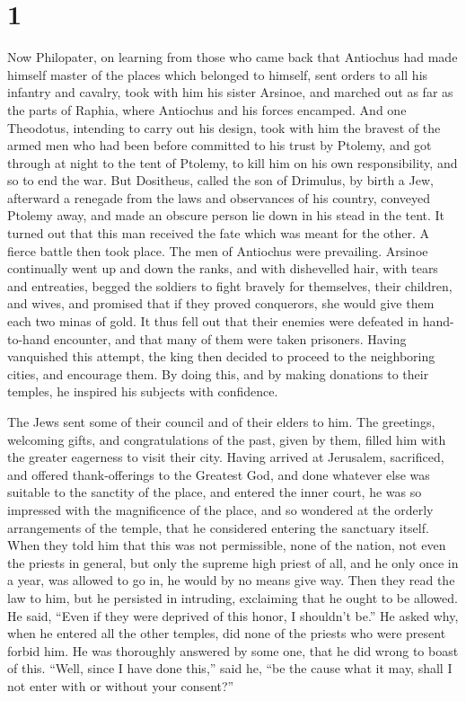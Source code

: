 \hypertarget{section}{%
\section{1}\label{section}}

 Now Philopater, on learning from those who came back that
Antiochus had made himself master of the places which belonged to
himself, sent orders to all his infantry and cavalry, took with him his
sister Arsinoe, and marched out as far as the parts of Raphia, where
Antiochus and his forces encamped.  And one Theodotus,
intending to carry out his design, took with him the bravest of the
armed men who had been before committed to his trust by Ptolemy, and got
through at night to the tent of Ptolemy, to kill him on his own
responsibility, and so to end the war.  But Dositheus,
called the son of Drimulus, by birth a Jew, afterward a renegade from
the laws and observances of his country, conveyed Ptolemy away, and made
an obscure person lie down in his stead in the tent. It turned out that
this man received the fate which was meant for the other. 
A fierce battle then took place. The men of Antiochus were prevailing.
Arsinoe continually went up and down the ranks, and with dishevelled
hair, with tears and entreaties, begged the soldiers to fight bravely
for themselves, their children, and wives, and promised that if they
proved conquerors, she would give them each two minas of gold.
 It thus fell out that their enemies were defeated in
hand-to-hand encounter, and that many of them were taken prisoners.
 Having vanquished this attempt, the king then decided to
proceed to the neighboring cities, and encourage them.  By
doing this, and by making donations to their temples, he inspired his
subjects with confidence.

 The Jews sent some of their council and of their elders
to him. The greetings, welcoming gifts, and congratulations of the past,
given by them, filled him with the greater eagerness to visit their
city.  Having arrived at Jerusalem, sacrificed, and
offered thank-offerings to the Greatest God, and done whatever else was
suitable to the sanctity of the place, and entered the inner court,
 he was so impressed with the magnificence of the place,
and so wondered at the orderly arrangements of the temple, that he
considered entering the sanctuary itself.  When they told
him that this was not permissible, none of the nation, not even the
priests in general, but only the supreme high priest of all, and he only
once in a year, was allowed to go in, he would by no means give way.
 Then they read the law to him, but he persisted in
intruding, exclaiming that he ought to be allowed. He said, ``Even if
they were deprived of this honor, I shouldn't be.''  He
asked why, when he entered all the other temples, did none of the
priests who were present forbid him.  He was thoroughly
answered by some one, that he did wrong to boast of this.
 ``Well, since I have done this,'' said he, ``be the
cause what it may, shall I not enter with or without your consent?''

